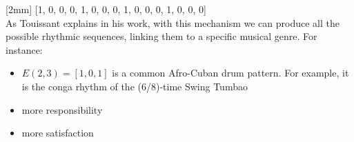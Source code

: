 \documentclass[main.tex]{subfiles}
\begin{document}
[2mm]
[1, 0, 0, 0, 1, 0, 0, 0, 1, 0, 0, 0, 1, 0, 0, 0]\\
[3mm]
As Touissant explains in his work\cite{Toussaint:2004:euclidean:rhythm}, with this mechanism we can produce all the possible rhythmic sequences, linking them to a specific musical genre. For instance:
\begin{itemize}[noitemsep]
\item \begin{math}E(2,3)=[1,0,1]\end{math} is a common Afro-Cuban drum pattern. For example, it is the conga rhythm of the (6/8)-time Swing Tumbao
\item more responsibility
\item more satisfaction
\end{itemize}
\end{document}
